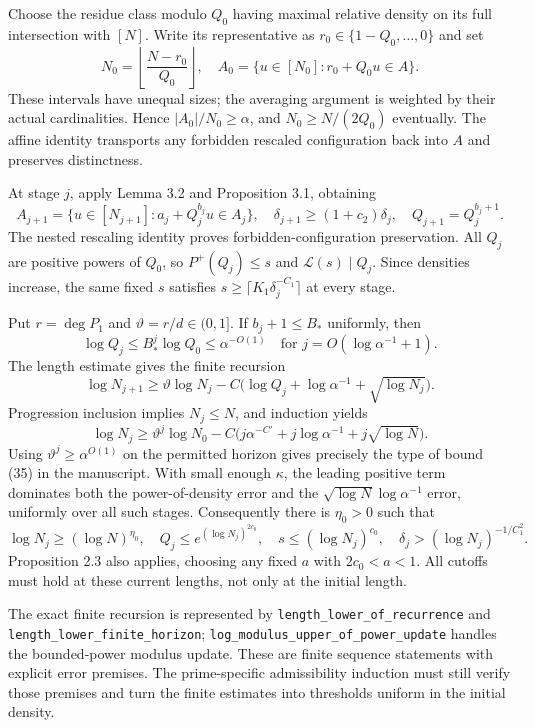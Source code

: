 Choose the residue class modulo $Q_0$ having maximal relative density on its full intersection with $[N]$. Write its representative as $r_0\in\{1-Q_0,\ldots,0\}$ and set
\[
 N_0=\left\lfloor\frac{N-r_0}{Q_0}\right\rfloor,\quad
 A_0=\{u\in[N_0]:r_0+Q_0u\in A\}.
\]
These intervals have unequal sizes; the averaging argument is weighted by their actual cardinalities. Hence $|A_0|/N_0\geq\alpha$, and $N_0\geq N/(2Q_0)$ eventually. The affine identity transports any forbidden rescaled configuration back into $A$ and preserves distinctness.

At stage $j$, apply Lemma 3.2 and Proposition 3.1, obtaining
\[
 A_{j+1}=\{u\in[N_{j+1}]:a_j+Q_j^{b_j}u\in A_j\},\quad
 \delta_{j+1}\geq(1+c_2)\delta_j,\quad Q_{j+1}=Q_j^{b_j+1}.
\]
The nested rescaling identity proves forbidden-configuration preservation. All $Q_j$ are positive powers of $Q_0$, so $P^+(Q_j)\leq s$ and $\mathcal L(s)\mid Q_j$. Since densities increase, the same fixed $s$ satisfies $s\geq\lceil K_1\delta_j^{-C_1}\rceil$ at every stage.

Put $r=\deg P_1$ and $\vartheta=r/d\in(0,1]$. If $b_j+1\leq B_*$ uniformly, then
\[
 \log Q_j\leq B_*^j\log Q_0\leq\alpha^{-O(1)}
 \quad\text{for }j=O(\log\alpha^{-1}+1).
\]
The length estimate gives the finite recursion
\[
 \log N_{j+1}\geq\vartheta\log N_j
 -C\bigl(\log Q_j+\log\alpha^{-1}+\sqrt{\log N_j}\bigr).
\]
Progression inclusion implies $N_j\leq N$, and induction yields
\[
 \log N_j\geq\vartheta^j\log N_0
 -C\bigl(j\alpha^{-C'}+j\log\alpha^{-1}+j\sqrt{\log N}\bigr).
\]
Using $\vartheta^j\geq\alpha^{O(1)}$ on the permitted horizon gives precisely the type of bound (35) in the manuscript. With small enough $\kappa$, the leading positive term dominates both the power-of-density error and the $\sqrt{\log N}\log\alpha^{-1}$ error, uniformly over all such stages. Consequently there is $\eta_0>0$ such that
\[
 \log N_j\geq(\log N)^{\eta_0},\quad
 Q_j\leq e^{(\log N_j)^{2c_0}},\quad
 s\leq(\log N_j)^{c_0},\quad
 \delta_j>(\log N_j)^{-1/C_1^2}.
\]
Proposition 2.3 also applies, choosing any fixed $a$ with $2c_0<a<1$. All cutoffs must hold at these current lengths, not only at the initial length.

The exact finite recursion is represented by \texttt{length\_\allowbreak{}lower\_\allowbreak{}of\_\allowbreak{}recurrence} and \texttt{length\_\allowbreak{}lower\_\allowbreak{}finite\_\allowbreak{}horizon}; \texttt{log\_\allowbreak{}modulus\_\allowbreak{}upper\_\allowbreak{}of\_\allowbreak{}power\_\allowbreak{}update} handles the bounded-power modulus update. These are finite sequence statements with explicit error premises. The prime-specific admissibility induction must still verify those premises and turn the finite estimates into thresholds uniform in the initial density.

